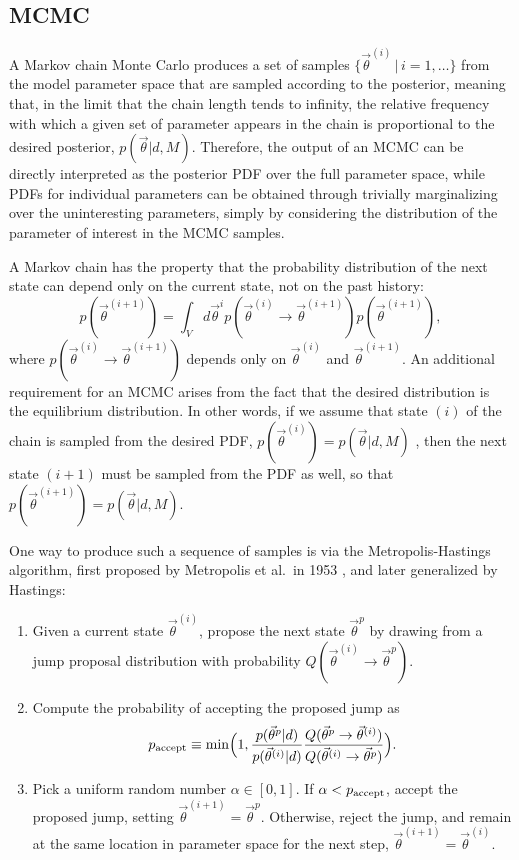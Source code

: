 \documentclass[prd,preprint]{revtex4}
\newcommand{\vtheta}{\vec{\theta}}
\newcommand{\be}{\begin{equation}}
\newcommand{\ee}{\end{equation}}
\begin{document}
\subsection{MCMC} \label{sec:mcmc}

A Markov chain Monte Carlo produces a set of samples $\{ \vtheta^{(i)} \, | \, i = 1, \ldots \}$ from the model parameter space that are sampled according to the posterior, meaning that, in the limit that the chain length tends to infinity, the relative frequency with which a given set of parameter appears in the chain is proportional to the desired posterior, $p(\vtheta|d,M)$.  Therefore, the output of an MCMC can be directly interpreted as the posterior PDF over the full parameter space, while PDFs for individual parameters can be obtained through trivially marginalizing over the uninteresting parameters, simply by considering the distribution of the parameter of interest in the MCMC samples.

A Markov chain has the property that the probability distribution of the next state can depend only on the current state, not on the past history:
\be
p(\vtheta^{(i+1)})=\int_{V} d\vtheta^{i} p(\vtheta^{(i)} \to \vtheta^{(i+1)}) p(\vtheta^{(i+1)}),
\ee
where $p(\vtheta^{(i)} \to \vtheta^{(i+1)})$ depends only on $\vtheta^{(i)}$ and $\vtheta^{(i+1)}$. 
An additional requirement for an MCMC arises from the fact that the desired distribution is the equilibrium distribution.  In other words, if we assume that state $(i)$ of the chain is sampled from the desired PDF, $p(\vtheta^{(i)})=p(\vtheta|d,M)$ , then the next state $(i+1)$ must be sampled from the PDF as well, so that $p(\vtheta^{(i+1)})=p(\vtheta|d,M)$.  

One way to produce such a sequence of samples is via the Metropolis-Hastings algorithm, first proposed by Metropolis et al.~in 1953 \cite{Metropolis:1953}, and later generalized by Hastings:
\begin{enumerate}
  \item Given a current state $\vtheta^{(i)}$, propose the next state $\vtheta^p$ by drawing from a jump proposal distribution with probability $Q(\vtheta^{(i)} \to \vtheta^p)$.  
  \item Compute the probability of accepting the proposed jump as
\be
p_{\textnormal{accept}}  \equiv \min\Bigl(1,  \frac{p(\vtheta^p|d)}{p(\vtheta^{(i)}|d)} \frac{Q(\vtheta^p \to
        \vtheta^{(i)})}{Q(\vtheta^{(i)} \to \vtheta^p)} \Bigr).
\ee
\item Pick a uniform random number $\alpha \in [0,1]$.  If $\alpha<  p_{\textnormal{accept}}$, accept the proposed jump, setting $\vtheta^{(i+1)}=\vtheta^p$.  Otherwise, reject the jump, and remain at the same location in parameter space for the next step, $\vtheta^{(i+1)}=\vtheta^{(i)}$.
 \end{enumerate}
 
\end{document}
